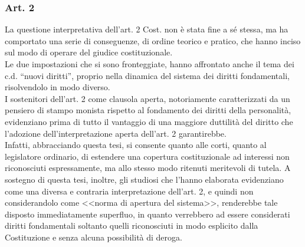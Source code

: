 \subsubsection{Art. 2}
La questione interpretativa dell’art. 2 Cost. non è stata fine a sé stessa, ma ha comportato una serie di conseguenze, di ordine teorico e pratico, che hanno inciso sul modo di operare del giudice costituzionale.  
\\Le due impostazioni che si sono fronteggiate, hanno affrontato anche il tema dei c.d. “nuovi diritti”, proprio nella dinamica del sistema dei diritti fondamentali, risolvendolo in modo diverso.
\\I sostenitori dell'art. 2 come clausola aperta, notoriamente caratterizzati da un pensiero di stampo monista rispetto al fondamento dei diritti della personalità, evidenziano prima di tutto il vantaggio di una maggiore duttilità del diritto che l'adozione dell'interpretazione aperta dell'art. 2 garantirebbe.
\\Infatti, abbracciando questa tesi, si consente quanto alle corti, quanto al legislatore ordinario, di estendere una copertura costituzionale ad interessi non riconosciuti espressamente, ma allo stesso modo ritenuti meritevoli di tutela. A sostegno di questa tesi, inoltre, gli studiosi che l'hanno elaborata evidenziano come una diversa e contraria interpretazione dell'art. 2, e quindi non considerandolo come <<norma di apertura del sistema>>, renderebbe tale disposto immediatamente superfluo, in quanto verrebbero ad essere considerati diritti fondamentali soltanto quelli riconosciuti in modo esplicito dalla Costituzione e senza alcuna possibilità di deroga.

